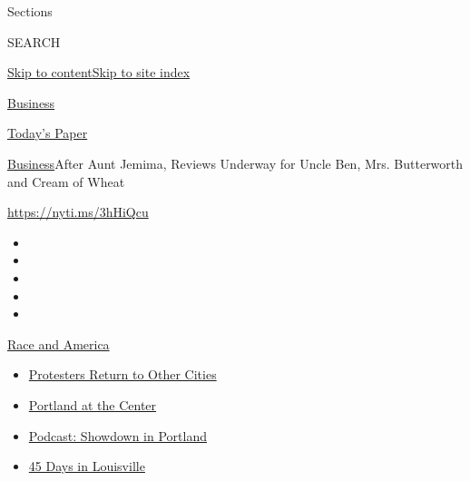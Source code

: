 Sections

SEARCH

\protect\hyperlink{site-content}{Skip to
content}\protect\hyperlink{site-index}{Skip to site index}

\href{https://www.nytimes.com/section/business}{Business}

\href{https://myaccount.nytimes.com/auth/login?response_type=cookie\&client_id=vi}{}

\href{https://www.nytimes.com/section/todayspaper}{Today's Paper}

\href{/section/business}{Business}\textbar{}After Aunt Jemima, Reviews
Underway for Uncle Ben, Mrs. Butterworth and Cream of Wheat

\url{https://nyti.ms/3hHiQcu}

\begin{itemize}
\item
\item
\item
\item
\item
\end{itemize}

\href{https://www.nytimes.com/news-event/george-floyd-protests-minneapolis-new-york-los-angeles?action=click\&pgtype=Article\&state=default\&region=TOP_BANNER\&context=storylines_menu}{Race
and America}

\begin{itemize}
\tightlist
\item
  \href{https://www.nytimes.com/2020/07/26/us/protests-portland-seattle-trump.html?action=click\&pgtype=Article\&state=default\&region=TOP_BANNER\&context=storylines_menu}{Protesters
  Return to Other Cities}
\item
  \href{https://www.nytimes.com/2020/07/24/us/portland-oregon-protests-white-race.html?action=click\&pgtype=Article\&state=default\&region=TOP_BANNER\&context=storylines_menu}{Portland
  at the Center}
\item
  \href{https://www.nytimes.com/2020/07/23/podcasts/the-daily/portland-protests.html?action=click\&pgtype=Article\&state=default\&region=TOP_BANNER\&context=storylines_menu}{Podcast:
  Showdown in Portland}
\item
  \href{https://www.nytimes.com/interactive/2020/07/16/us/black-lives-matter-protests-louisville-breonna-taylor.html?action=click\&pgtype=Article\&state=default\&region=TOP_BANNER\&context=storylines_menu}{45
  Days in Louisville}
\end{itemize}

